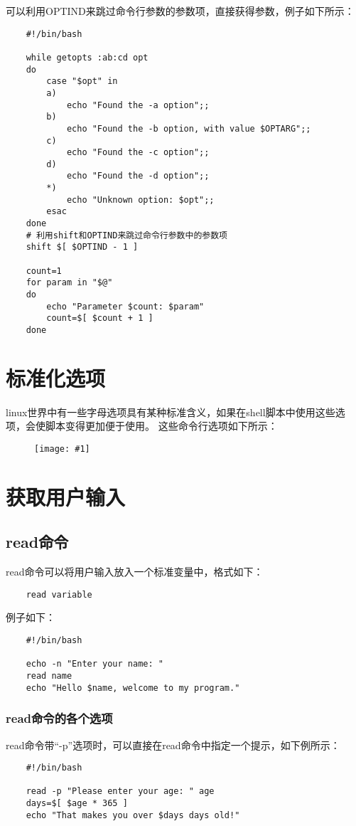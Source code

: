 \documentclass[a4paper,left=2.5cm,right=2.5cm,11pt]{article}
\newcommand{\fic}[1]{\begin{figure}[H]
		\center
		\texttt{[image: \#1]}
	\end{figure}}
\begin{document}
	可以利用OPTIND来跳过命令行参数的参数项，直接获得参数，例子如下所示：
	\begin{lstlisting}
	#!/bin/bash

	while getopts :ab:cd opt
	do
		case "$opt" in
		a)
			echo "Found the -a option";;
		b)
			echo "Found the -b option, with value $OPTARG";;
		c)
			echo "Found the -c option";;
		d)
			echo "Found the -d option";;
		*)
			echo "Unknown option: $opt";;
		esac
	done
	# 利用shift和OPTIND来跳过命令行参数中的参数项
	shift $[ $OPTIND - 1 ]

	count=1
	for param in "$@"
	do
		echo "Parameter $count: $param"
		count=$[ $count + 1 ]
	done
	\end{lstlisting}

\section{标准化选项}
	linux世界中有一些字母选项具有某种标准含义，如果在shell脚本中使用这些选项，会使脚本变得更加便于使用。
	这些命令行选项如下所示：
	\fic{1.png}

\section{获取用户输入}
\subsection{read命令}
	read命令可以将用户输入放入一个标准变量中，格式如下：
	\begin{lstlisting}
	read variable
	\end{lstlisting}

	例子如下：
	\begin{lstlisting}
	#!/bin/bash

	echo -n "Enter your name: "
	read name
	echo "Hello $name, welcome to my program."
	\end{lstlisting}

\subsubsection{read命令的各个选项}

	read命令带“-p”选项时，可以直接在read命令中指定一个提示，如下例所示：
	\begin{lstlisting}
	#!/bin/bash

	read -p "Please enter your age: " age
	days=$[ $age * 365 ]
	echo "That makes you over $days days old!"
	\end{lstlisting}
\end{document}
